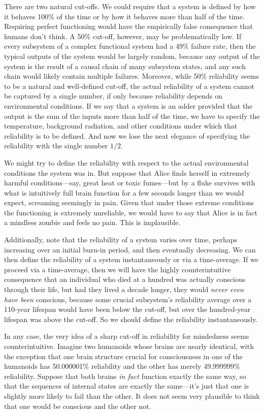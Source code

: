 There are two natural cut-offs. We could require that a system is defined by how it behaves 100\% of the time or by how it behaves
more than half of the time. Requiring perfect functioning would have the empirically false consequence that humans don't think. 
A 50\% cut-off, however, may be problematically low. If every subsystem of a complex functional system had a 49\% failure rate, then 
the typical outputs of the system would be largely random, because any output of the system is the result of a causal chain of many 
subsystem states, and any such chain would likely contain multiple failures. Moreover, while 50\% reliability seems to be a natural
and well-defined cut-off, the actual reliability of a system cannot be captured by a single number, if only because reliability
depends on environmental conditions. If we say that a system is an adder provided that the output is the sum of the inputs more
than half of the time, we have to specify the temperature, background radiation, and other conditions under which that reliability
is to be defined. And now we lose the neat elegance of specifying the reliability with the single number $1/2$.

We might try to define the reliability with respect to the actual environmental conditions the system was in. But suppose that
Alice finds herself in extremely harmful conditions---say, great heat or toxic fumes---but by a fluke survives with what is intuitively
full brain function for a few seconds longer than we would expect, screaming seemingly in pain. Given that under those extreme conditions
the functioning is extremely unreliable, we would have to say that Alice is in fact a mindless zombie and feels no pain. This is
implausible. 

Additionally, note that the reliability of a system varies over time, perhaps increasing over an initial burn-in period,
and then eventually decreasing. We can then define the reliability of a system instantaneously or via a time-average.
If we proceed via a time-average, then we will have the highly counterintuitive consequence that an individual who died
at a hundred was actually conscious through their life, but had they lived a decade longer, they would \textit{never even have been} 
conscious, because some crucial subsystem's reliability average over a 110-year lifespan would have been below the cut-off, but over
the hundred-year lifespan was above the cut-off. So we should define the reliability instantaneously. 

In any case, the very idea of a sharp cut-off in reliability for mindedness seems counterintuitive. Imagine two humanoids whose 
brains are nearly identical, with the exception that one brain structure crucial for consciousness in one of the humanoids has 
50.000001\% reliability and the other has merely 49.999999\% reliability. Suppose that both brains \textit{in fact}
function exactly the same way, so that the sequences of internal states are exactly the same---it's just that one is slightly
more likely to fail than the other. It does not seem very plausible to think that one would be conscious and the other not.

